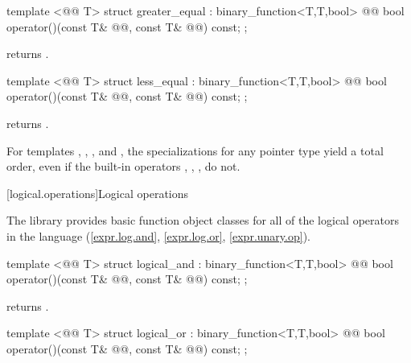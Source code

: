 \documentclass[american,twoside]{book}
\begin{document}
%
\begin{itemdecl}
template <@@ T> struct greater_equal : binary_function<T,T,bool> {
  @@
    bool operator()(const T& @@, const T& @@) const;
};
\end{itemdecl}

\begin{itemdescr}
\pnum
{} returns .
\end{itemdescr}

%
\begin{itemdecl}
template <@@ T> struct less_equal : binary_function<T,T,bool> {
  @@
    bool operator()(const T& @@, const T& @@) const;
};
\end{itemdecl}

\begin{itemdescr}
\pnum
{} returns .
\end{itemdescr}

\pnum
For templates , , , and
, the specializations for any pointer type yield a total order,
even if the built-in operators \tcode{<}, \tcode{>}, \tcode{<=}, \tcode{>=}
do not.

[logical.operations]{Logical operations}

\pnum
The library provides basic function object classes for all of the logical
operators in the language (\ref{expr.log.and}, \ref{expr.log.or}, \ref{expr.unary.op}).

%
\begin{itemdecl}
template <@@ T> struct logical_and : binary_function<T,T,bool> {
  @@
    bool operator()(const T& @@, const T& @@) const;
};
\end{itemdecl}

\begin{itemdescr}
\pnum
{} returns .
\end{itemdescr}

%
\begin{itemdecl}
template <@@ T> struct logical_or : binary_function<T,T,bool> {
  @@
    bool operator()(const T& @@, const T& @@) const;
};
\end{itemdecl}
\end{document}
